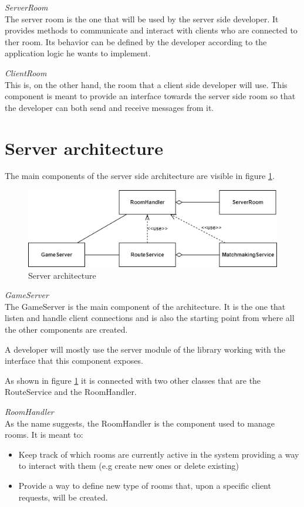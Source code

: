 \bigskip
\textit{ServerRoom}
\\
The server room is the one that will be used by the server side developer. It provides methods to communicate and interact with clients who are connected to ther room. Its behavior can be defined by the developer according to the application logic he wants to implement.

\bigskip
\textit{ClientRoom}
\\
This is, on the other hand, the room that a client side developer will use. This component is meant to provide an interface towards the server side room so that the developer can both send and receive messages from it.

\section{Server architecture} \label{sec:server_arch}
The main components of the server side architecture are visible in figure \ref{fig:server_classes}. 

\begin{figure}[H]
	\includegraphics[scale=0.7]{images/3-architecture/server_architecture-classes.png}
	\caption{Server architecture}
	\label{fig:server_classes}
\end{figure}

\bigskip
\textit{GameServer}
\\
The GameServer is the main component of the architecture. It is the one that listen and handle client connections and is also the starting point from where all the other components are created.

A developer will mostly use the server module of the library working with the interface that this component exposes.

As shown in figure \ref{fig:server_classes} it is connected with two other classes that are the RouteService and the RoomHandler.

\bigskip
\textit{RoomHandler}
\\
As the name suggests, the RoomHandler is the component used to manage rooms. It is meant to: 
\begin{itemize}
	\item Keep track of which rooms are currently active in the system providing a way to interact with them (e.g create new ones or delete existing)
	\item Provide a way to define new type of rooms that, upon a specific client requests, will be created.
\end{itemize}


